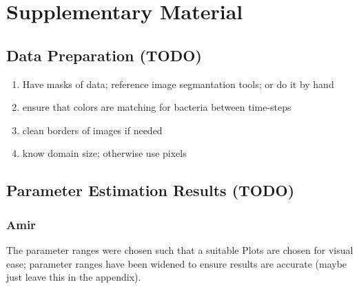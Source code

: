 \documentclass[10pt,letterpaper]{article}
\begin{document}
\appendix
\renewcommand{\thesection}{}
\renewcommand{\thesubsection}{S\arabic{subsection}}
\section{Supplementary Material}

\subsection{Data Preparation (TODO)}
\begin{enumerate}
    \item Have masks of data; reference image segmantation tools; or do it by hand
    \item ensure that colors are matching for bacteria between time-steps
    \item clean borders of images if needed
    \item know domain size; otherwise use pixels
\end{enumerate}

\subsection{Parameter Estimation Results (TODO)}
\label{sec:supplement-parameter-profiles}

\subsubsection{Amir}
\label{subsec:supplement-parameter-profiles-amir}

The parameter ranges were chosen such that a suitable 
Plots are chosen for visual ease; parameter ranges have been widened to ensure results are
accurate (maybe just leave this in the appendix).
\end{document}
